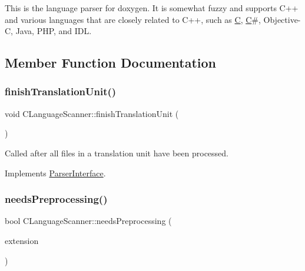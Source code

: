 This is the language parser for doxygen. It is somewhat fuzzy and supports C++ and various languages that are closely related to C++, such as \mbox{\hyperlink{class_c}{C}}, \mbox{\hyperlink{class_c}{C}}\#, Objective-\/C, Java, P\+HP, and I\+DL. 

\subsection{Member Function Documentation}
\mbox{\label{class_c_language_scanner_a03f5004bda27f5c73f3b9d74d9064b99}} 
\subsubsection{\texorpdfstring{finishTranslationUnit()}{finishTranslationUnit()}}
{\footnotesize\ttfamily void C\+Language\+Scanner\+::finish\+Translation\+Unit (\begin{DoxyParamCaption}{ }\end{DoxyParamCaption})\hspace{0.3cm}{\ttfamily [virtual]}}

Called after all files in a translation unit have been processed. 

Implements \mbox{\hyperlink{class_parser_interface_af3acd64c6a33852e2e46e7288eb9c9cf}{Parser\+Interface}}.

\mbox{\label{class_c_language_scanner_a88315d1d6591098e284bd2b91d4ba233}} 
\subsubsection{\texorpdfstring{needsPreprocessing()}{needsPreprocessing()}}
{\footnotesize\ttfamily bool C\+Language\+Scanner\+::needs\+Preprocessing (\begin{DoxyParamCaption}\item[{const \mbox{\hyperlink{class_q_c_string}{Q\+C\+String}} \&}]{extension }\end{DoxyParamCaption})\hspace{0.3cm}{\ttfamily [virtual]}}

